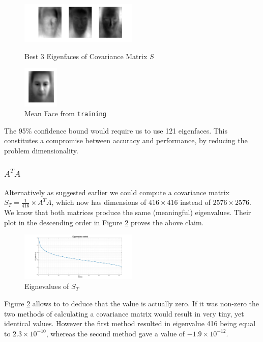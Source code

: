 \documentclass[10pt,twocolumn,letterpaper]{article}
\begin{document}
\begin{figure}[H]

\centering
\includegraphics[width=0.5\textwidth]{../results/Q1A_PCA_Eigenfaces}

  \caption{Best 3 Eigenfaces of Covariance Matrix $S$ \label{fig:Eig2}}

\centering
\includegraphics[width=0.15\textwidth]{../results/Q1A_PCA_Mean}

  \caption{Mean Face from {\tt\small training} \label{fig:Mean}}

\end{figure}


The 95\% confidence bound would require us to use 121 eigenfaces. This constitutes a compromise between accuracy and performance, by reducing the problem dimensionality.
\subsubsection{\boldmath$A^TA$} \label{sec:ata}
Alternatively as suggested earlier we could compute a covariance matrix $S_T = \frac{1}{416} \times A^TA$, which now has dimensions of $416 \times 416$ instead of $2576 \times 2576$. We know \cite{Data Mining} that both matrices produce the same (meaningful) eigenvalues. Their plot in the  descending order in Figure \ref{fig:Eig3} proves the above claim.

\begin{figure}[H]
\centering
\includegraphics[width=0.5\textwidth]{../results/Q1B_PCA_Eigenvalues}

  \caption{Eignevalues of $S_T$ \label{fig:Eig3}}

\end{figure}
\setlength{\belowdisplayshortskip}{0pt}
\setlength{\abovedisplayshortskip}{0pt}
Figure \ref{fig:Eig3} allows to to deduce that the  value is actually zero. If it was non-zero the two methods of calculating a covariance matrix would result in very tiny, yet identical values. However the first method resulted in eigenvalue 416 being equal to $2.3 \times 10^{-10}$, whereas the second method gave a value of $-1.9 \times 10^{-12}$.
\end{document}
